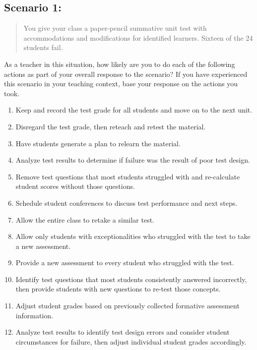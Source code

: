 \documentclass[
]{book}
\providecommand{\tightlist}{%
  \setlength{\itemsep}{0pt}\setlength{\parskip}{0pt}}
\begin{document}
\hypertarget{scenario-1}{%
\subsection{Scenario 1:}\label{scenario-1}}

\begin{quote}
You give your class a paper-pencil summative unit test with accommodations and modifications for identified learners. Sixteen of the 24 students fail.
\end{quote}

As a teacher in this situation, how likely are you to do each of the following actions as part of your overall response to the scenario? If you have experienced this scenario in your teaching context, base your response on the actions you took.

\begin{enumerate}
\def\labelenumi{\arabic{enumi}.}
\tightlist
\item
  Keep and record the test grade for all students and move on to the next unit.
\item
  Disregard the test grade, then reteach and retest the material.
\item
  Have students generate a plan to relearn the material.
\item
  Analyze test results to determine if failure was the result of poor test design.
\item
  Remove test questions that most students struggled with and re-calculate student scores without those questions.
\item
  Schedule student conferences to discuss test performance and next steps.
\item
  Allow the entire class to retake a similar test.
\item
  Allow only students with exceptionalities who struggled with the test to take a new assessment.
\item
  Provide a new assessment to every student who struggled with the test.
\item
  Identify test questions that most students consistently answered incorrectly, then provide students with new questions to re-test those concepts.
\item
  Adjust student grades based on previously collected formative assessment information.
\item
  Analyze test results to identify test design errors and consider student circumstances for failure, then adjust individual student grades accordingly.
\end{enumerate}
\end{document}
